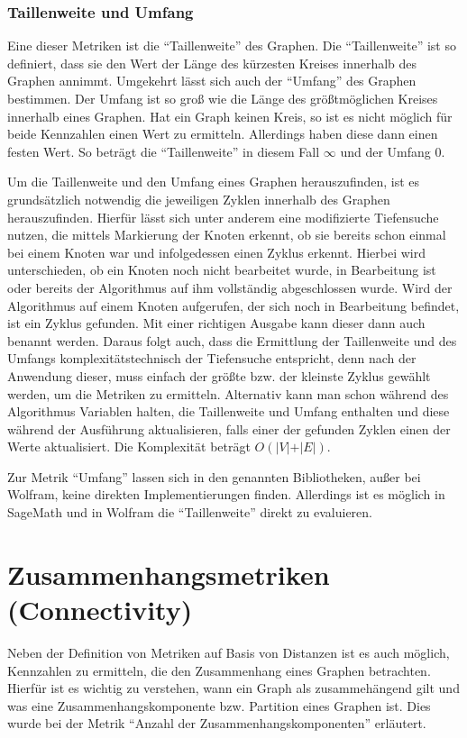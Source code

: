 \documentclass[a4paper,12pt,ngerman,chapterprefix=false,listof=totoc,bibliography=totoc]{scrreprt}
\begin{document}
\subsubsection*{Taillenweite und Umfang}
{
Eine dieser Metriken ist die "`Taillenweite"' des Graphen. Die "`Taillenweite"' ist so definiert, dass sie den Wert der Länge des kürzesten Kreises innerhalb des Graphen annimmt. Umgekehrt lässt sich auch der "`Umfang"' des Graphen bestimmen. Der Umfang ist so groß wie die Länge des größtmöglichen Kreises innerhalb eines Graphen. Hat ein Graph keinen Kreis, so ist es nicht möglich für beide Kennzahlen einen Wert zu ermitteln. Allerdings haben diese dann einen festen Wert. So beträgt die "`Taillenweite"' in diesem Fall \(\infty\) und der Umfang 0. \cite{diestel_graphentheorie_2000}

Um die Taillenweite und den Umfang eines Graphen herauszufinden, ist es grundsätzlich notwendig die jeweiligen Zyklen innerhalb des Graphen herauszufinden. Hierfür lässt sich unter anderem eine modifizierte Tiefensuche nutzen, die mittels Markierung der Knoten erkennt, ob sie bereits schon einmal bei einem Knoten war und infolgedessen einen Zyklus erkennt. Hierbei wird unterschieden, ob ein Knoten noch nicht bearbeitet wurde, in Bearbeitung ist oder bereits der Algorithmus auf ihm vollständig abgeschlossen wurde. Wird der Algorithmus auf einem Knoten aufgerufen, der sich noch in Bearbeitung befindet, ist ein Zyklus gefunden. Mit einer richtigen Ausgabe kann dieser dann auch benannt werden. Daraus folgt auch, dass die Ermittlung der Taillenweite und des Umfangs komplexitätstechnisch der Tiefensuche entspricht, denn nach der Anwendung dieser, muss einfach der größte bzw. der kleinste Zyklus gewählt werden, um die Metriken zu ermitteln. Alternativ kann man schon während des Algorithmus Variablen halten, die Taillenweite und Umfang enthalten und diese während der Ausführung aktualisieren, falls einer der gefunden Zyklen einen der Werte aktualisiert. Die Komplexität beträgt \(O(\vert V\vert +\vert E\vert)\). \cite{knebl_algorithmen_2019,vocking_taschenbuch_2008}

Zur Metrik "`Umfang"' lassen sich in den genannten Bibliotheken, außer bei Wolfram, keine direkten Implementierungen finden. Allerdings ist es möglich in SageMath und in Wolfram die "`Taillenweite"' direkt zu evaluieren. \cite{sagemath_graph_2020,wolfram_wolfram_2020}
}
\section{Zusammenhangsmetriken (Connectivity)}
{
Neben der Definition von Metriken auf Basis von Distanzen ist es auch möglich, Kennzahlen zu ermitteln, die den Zusammenhang eines Graphen betrachten. Hierfür ist es wichtig zu verstehen, wann ein Graph als zusammehängend gilt und was eine Zusammenhangskomponente bzw. Partition eines Graphen ist. Dies wurde bei der Metrik "`Anzahl der Zusammenhangskomponenten"' erläutert.
}
\end{document}
